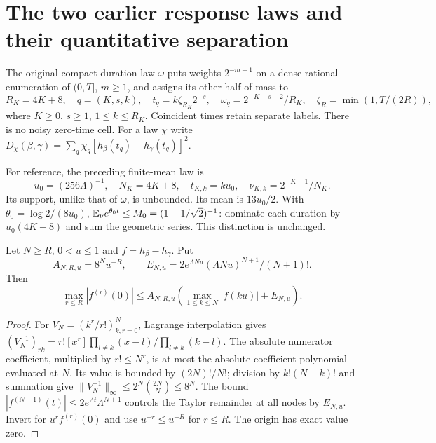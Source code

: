 \section{The two earlier response laws and their quantitative separation}
\label{sec:separation}
The original compact-duration law $\omega$ puts weights $2^{-m-1}$ on a dense
rational enumeration of $(0,T]$, $m\ge1$, and assigns its other half of mass to
\begin{equation}
 R_K=4K+8,\quad q=(K,s,k),\quad
 t_q=k\zeta_{R_K}2^{-s},\quad \omega_q=2^{-K-s-2}/R_K,
 \quad\zeta_R=\min(1,T/(2R)),
 \label{eq:omega}
\end{equation}
where $K\ge0$, $s\ge1$, $1\le k\le R_K$. Coincident times retain separate
labels. There is no noisy zero-time cell. For a law $\chi$ write
$D_\chi(\beta,\gamma)=\sum_q\chi_q[h_\beta(t_q)-h_\gamma(t_q)]^2$.

For reference, the preceding finite-mean law is
\begin{equation}
 u_0=(256\Lambda)^{-1},\quad N_K=4K+8,\quad
 t_{K,k}=ku_0,\quad \nu_{K,k}=2^{-K-1}/N_K.
 \label{eq:nu}
\end{equation}
Its support, unlike that of $\omega$, is unbounded. Its mean is $13u_0/2$.
With $\theta_0=\log2/(8u_0)$,
$\mathbb E_\nu e^{\theta_0t}\le M_0=(1-1/\sqrt2)^{-1}$: dominate each duration by
$u_0(4K+8)$ and sum the geometric series. This distinction is unchanged.

\begin{lemma}
\label{lem:grid}
Let $N\ge R$, $0<u\le1$ and $f=h_\beta-h_\gamma$. Put
\[
 A_{N,R,u}=8^Nu^{-R},\qquad
 E_{N,u}=2e^{\Lambda Nu}(\Lambda Nu)^{N+1}/(N+1)!.
\]
Then
\begin{equation}
 \max_{r\le R}|f^{(r)}(0)|\le
 A_{N,R,u}\left(\max_{1\le k\le N}|f(ku)|+E_{N,u}\right).
 \label{eq:grid}
\end{equation}
\end{lemma}
\begin{proof}
For $V_N=(k^r/r!)_{k,r=0}^N$, Lagrange interpolation gives
$(V_N^{-1})_{rk}=r![x^r]\prod_{l\ne k}(x-l)/\prod_{l\ne k}(k-l)$.
The absolute numerator coefficient, multiplied by $r!\le N^r$, is at most
the absolute-coefficient polynomial evaluated at $N$. Its value is bounded
by $(2N)!/N!$; division by $k!(N-k)!$ and summation give
$\|V_N^{-1}\|_\infty\le2^N\binom{2N}{N}\le8^N$.
The bound $|f^{(N+1)}(t)|\le2e^{\Lambda t}\Lambda^{N+1}$ controls the
Taylor remainder at all nodes by $E_{N,u}$. Invert for $u^rf^{(r)}(0)$
and use $u^{-r}\le u^{-R}$ for $r\le R$. The origin has exact value zero.
\end{proof}

